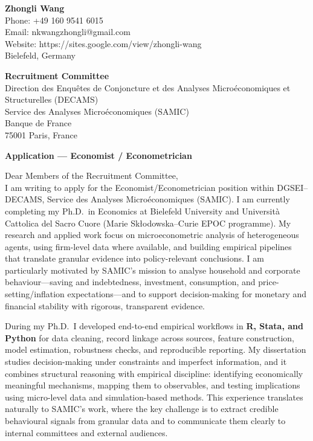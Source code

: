 \documentclass[11pt]{article}
\begin{document}
\noindent
\textbf{Zhongli Wang} \\
Phone: +49 160 9541 6015 \\
Email: nkwangzhongli@gmail.com \\
Website: https://sites.google.com/view/zhongli-wang \\
Bielefeld, Germany \\

\vspace{0.5cm}

\noindent
\textbf{Recruitment Committee} \\
Direction des Enqu\^etes de Conjoncture et des Analyses Micro\'economiques et Structurelles (DECAMS) \\
Service des Analyses Micro\'economiques (SAMIC) \\
Banque de France \\
75001 Paris, France \\

\vspace{0.5cm}

\noindent
\textbf{Application --- Economist / Econometrician} \\

\vspace{0.3cm}

\noindent Dear Members of the Recruitment Committee,\\[0.2cm]

I am writing to apply for the Economist/Econometrician position within DGSEI--DECAMS, Service des Analyses Micro\'economiques (SAMIC). 
I am currently completing my Ph.D.\ in Economics at Bielefeld University and Universit\`a Cattolica del Sacro Cuore (Marie Sk\l odowska--Curie EPOC programme). 
My research and applied work focus on microeconometric analysis of heterogeneous agents, using firm-level data where available, and building empirical pipelines that translate granular evidence into policy-relevant conclusions. 
I am particularly motivated by SAMIC's mission to analyse household and corporate behaviour---saving and indebtedness, investment, consumption, and price-setting/inflation expectations---and to support decision-making for monetary and financial stability with rigorous, transparent evidence.

During my Ph.D.\ I developed end-to-end empirical workflows in \textbf{R, Stata, and Python} for data cleaning, record linkage across sources, feature construction, model estimation, robustness checks, and reproducible reporting. 
My dissertation studies decision-making under constraints and imperfect information, and it combines structural reasoning with empirical discipline: identifying economically meaningful mechanisms, mapping them to observables, and testing implications using micro-level data and simulation-based methods. 
This experience translates naturally to SAMIC's work, where the key challenge is to extract credible behavioural signals from granular data and to communicate them clearly to internal committees and external audiences.
\end{document}
